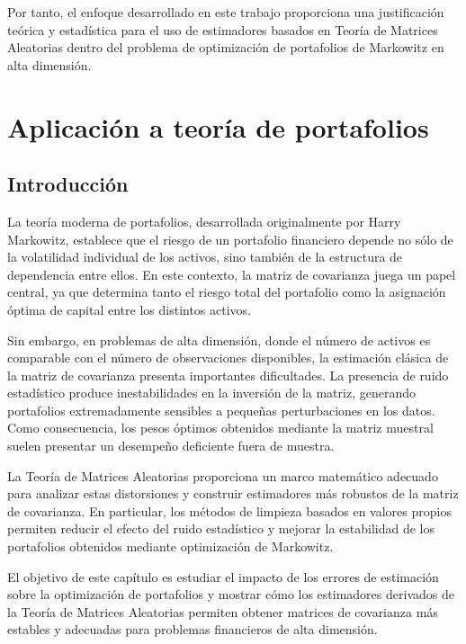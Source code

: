 \documentclass[letterpaper,12pt,oneside]{book}
\begin{document}
Por tanto, el enfoque desarrollado en este trabajo proporciona una justificación teórica y estadística para el uso de estimadores basados en Teoría de Matrices Aleatorias dentro del problema de optimización de portafolios de Markowitz en alta dimensión.

\chapter{Aplicación a teoría de portafolios}

\section{Introducción}

La teoría moderna de portafolios, desarrollada originalmente por Harry Markowitz, establece que el riesgo de un portafolio financiero depende no sólo de la volatilidad individual de los activos, sino también de la estructura de dependencia entre ellos. En este contexto, la matriz de covarianza juega un papel central, ya que determina tanto el riesgo total del portafolio como la asignación óptima de capital entre los distintos activos.

Sin embargo, en problemas de alta dimensión, donde el número de activos es comparable con el número de observaciones disponibles, la estimación clásica de la matriz de covarianza presenta importantes dificultades. La presencia de ruido estadístico produce inestabilidades en la inversión de la matriz, generando portafolios extremadamente sensibles a pequeñas perturbaciones en los datos. Como consecuencia, los pesos óptimos obtenidos mediante la matriz muestral suelen presentar un desempeño deficiente fuera de muestra.

La Teoría de Matrices Aleatorias proporciona un marco matemático adecuado para analizar estas distorsiones y construir estimadores más robustos de la matriz de covarianza. En particular, los métodos de limpieza basados en valores propios permiten reducir el efecto del ruido estadístico y mejorar la estabilidad de los portafolios obtenidos mediante optimización de Markowitz.

El objetivo de este capítulo es estudiar el impacto de los errores de estimación sobre la optimización de portafolios y mostrar cómo los estimadores derivados de la Teoría de Matrices Aleatorias permiten obtener matrices de covarianza más estables y adecuadas para problemas financieros de alta dimensión.
\end{document}
